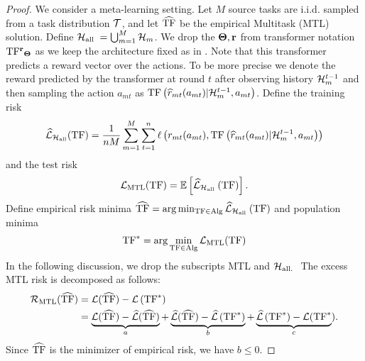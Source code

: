 \begin{proof}
We consider a meta-learning setting. Let $M$ source tasks are i.i.d. sampled from a task distribution $\mathcal{T}$, and let $\widehat{\mathrm{TF}}$ be the empirical Multitask (MTL) solution. 
%
Define $\mathcal{H}_{\text {all }}=\bigcup_{m=1}^M \mathcal{H}_m$. We drop the $\mathbf{\Theta}, \mathbf{r}$ from transformer notation $\mathrm{TF^{\mathbf{r}}}_{\mathbf{\Theta}}$ as we keep the architecture fixed as in \citet{lin2023transformers}. 
%
Note that this transformer predicts a reward vector over the actions. To be more precise we denote the reward predicted by the transformer at round $t$ after observing history $\mathcal{H}_m^{t-1}$ and then sampling the action $a_{mt}$ as $\mathrm{TF}\left(\widehat{r}_{m t}(a_{mt})|\mathcal{H}_m^{t-1}, a_{m t}\right)$.
%
%
Define the  training risk $$\widehat{\mathcal{L}}_{\mathcal{H}_{\mathrm{all}}}(\mathrm{TF})=\frac{1}{n M} \sum_{m=1}^M \sum_{t=1}^n \ell\left(r_{m t}(a_{mt}), \mathrm{TF}\left(\widehat{r}_{m t}(a_{mt})|\mathcal{H}_m^{t-1}, a_{m t}\right)\right)$$ and the test risk $$\mathcal{L}_{\mathrm{MTL}}(\mathrm{TF})=\mathbb{E}\left[\widehat{\mathcal{L}}_{\mathcal{H}_{\text {all }}}(\mathrm{TF})\right].$$ 
%
Define empirical risk minima $\widehat{\mathrm{TF}}=\arg \min _{\mathrm{TF} \in \mathrm{Alg}} \widehat{\mathcal{L}}_{\mathcal{H}_{\text {all }}}(\mathrm{TF})$ and population minima 
\begin{align*}
    \mathrm{TF}^{*}=\arg \min _{\mathrm{TF} \in \mathrm{Alg}} \mathcal{L}_{\mathrm{MTL}}(\mathrm{TF})
\end{align*}
In the following discussion, we drop the subscripts MTL and $\mathcal{H}_{\text {all. }}$ The excess MTL risk is decomposed as follows:
\begin{align*}
\mathcal{R}_{\mathrm{MTL}}(\widehat{\mathrm{TF}}) & =\mathcal{L}(\widehat{\mathrm{TF}})-\mathcal{L}\left(\mathrm{TF}^*\right) \\
& =\underbrace{\mathcal{L}(\widehat{\mathrm{TF}})-\widehat{\mathcal{L}}(\widehat{\mathrm{TF}})}_a+\underbrace{\widehat{\mathcal{L}}(\widehat{\mathrm{TF}})-\widehat{\mathcal{L}}\left(\mathrm{TF}^*\right)}_b+\underbrace{\widehat{\mathcal{L}}\left(\mathrm{TF}^*\right)-\mathcal{L}(\mathrm{TF}^*}_c) .
\end{align*}
Since $\widehat{\mathrm{TF}}$ is the minimizer of empirical risk, we have $b \leq 0$. 


\end{proof}
